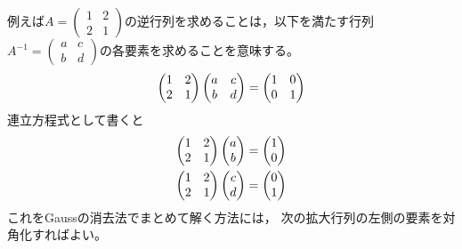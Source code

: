 \documentclass[twocolumn,11pt]{jarticle}
\begin{document}
例えば$A=
\begin{pmatrix}
  1 & 2 \\ 2 & 1
\end{pmatrix}
$の逆行列を求めることは，以下を満たす行列
$A^{-1}=
\begin{pmatrix}
  a & c \\ b & d
\end{pmatrix}
$の各要素を求めることを意味する。
\begin{align}
\begin{pmatrix}
  1 & 2 \\ 2 & 1
\end{pmatrix}
\begin{pmatrix}
  a & c \\ b & d
\end{pmatrix}
=\begin{pmatrix}
  1 & 0 \\ 0 & 1
\end{pmatrix}\notag
\end{align}
連立方程式として書くと
\begin{align}
  \begin{pmatrix}
    1 & 2 \\ 2 & 1
  \end{pmatrix}
  \begin{pmatrix}
    a \\ b \\
  \end{pmatrix}
  =\begin{pmatrix}
    1 \\ 0
  \end{pmatrix}\notag\\
  \begin{pmatrix}
    1 & 2 \\ 2 & 1
  \end{pmatrix}
  \begin{pmatrix}
    c \\ d
  \end{pmatrix}
  =\begin{pmatrix}
    0 \\ 1
  \end{pmatrix}\notag
\end{align}
これをGaussの消去法でまとめて解く方法には，
次の拡大行列の左側の要素を対角化すればよい。
\end{document}
